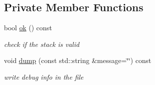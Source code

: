\subsection*{Private Member Functions}
\begin{DoxyCompactItemize}
\item 
bool \hyperlink{class_my_stack_adcf03c60e2cc3c0fdc4384c6fc469066}{ok} () const
\begin{DoxyCompactList}\small\item\em check if the stack is valid \end{DoxyCompactList}\item 
void \hyperlink{class_my_stack_a74626170a79ad9392cc987ef711e2933}{dump} (const std\+::string \&message=\char`\"{}\char`\"{}) const
\begin{DoxyCompactList}\small\item\em write debug info in the file \end{DoxyCompactList}\end{DoxyCompactItemize}
